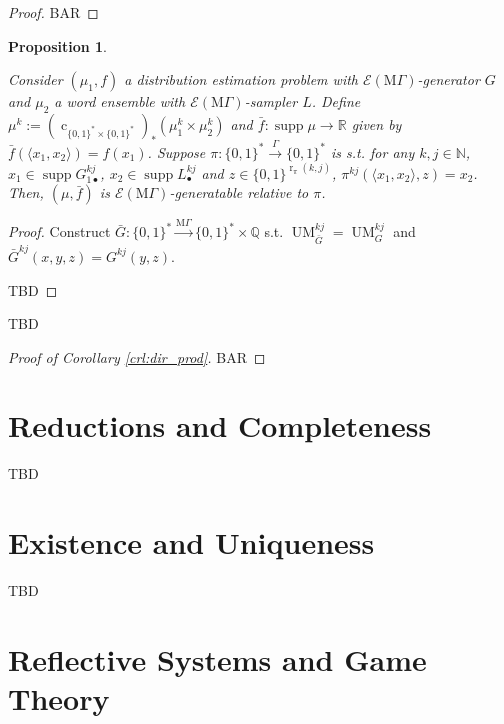 \documentclass{article}
\numberwithin{equation}{section}
\theoremstyle{definition}
\theoremstyle{plain}
\newtheorem{proposition}{Proposition}[section]
\newcommand{\Bool}{\{0,1\}}
\newcommand{\Words}{{\Bool^*}}
\DeclareMathOperator{\Supp}{supp}
\DeclareMathOperator{\R}{r}
\DeclareMathOperator{\UM}{UM}
\DeclareMathOperator{\En}{c}
\newcommand{\Nats}{\mathbb{N}}
\newcommand{\Rats}{\mathbb{Q}}
\newcommand{\Reals}{\mathbb{R}}
\newcommand{\Chev}[1]{\langle #1 \rangle}
\newcommand{\MGrow}{\mathrm{M}\Gamma}
\newcommand{\Fall}{\mathcal{E}}
\newcommand{\Scheme}{\xrightarrow{\Gamma}}
\newcommand{\MScheme}{\xrightarrow{\MGrow}}
\begin{document}
\begin{proof}

BAR

\end{proof}

\begin{samepage}
\begin{proposition}
\label{prp:tbd}

Consider $(\mu_1, f)$ a distribution estimation problem with $\Fall(\MGrow)$-generator $G$ and $\mu_2$ a word ensemble with $\Fall(\MGrow)$-sampler $L$. Define ${\mu^k:=(\En_{\Words \times \Words})_*(\mu_1^k \times \mu_2^k)}$ and $\bar{f}: \Supp \mu \rightarrow \Reals$ given by $\bar{f}(\Chev{x_1,x_2})=f(x_1)$. Suppose $\pi: \Words \Scheme \Words$ is s.t. for any $k,j \in \Nats$, $x_1 \in \Supp G_{1\bullet}^{kj}$, ${x_2 \in \Supp L_\bullet^{kj}}$ and $z \in \Bool^{\R_\pi(k,j)}$, $\pi^{kj}(\Chev{x_1,x_2},z)=x_2$. Then, $(\mu,\bar{f})$ is $\Fall(\MGrow)$-generatable relative to $\pi$.

\end{proposition}
\end{samepage}

\begin{proof}

Construct $\bar{G}: \Words \MScheme \Words \times \Rats$ s.t. $\UM_{\bar{G}}^{kj}=\UM_G^{kj}$ and ${\bar{G}^{kj}(x,y,z)=G^{kj}(y,z)}$. 

TBD

\end{proof}

TBD

\begin{proof}[Proof of Corollary \ref{crl:dir_prod}]

BAR

\end{proof}

\section{Reductions and Completeness}
\label{sec:reductions}

TBD

\section{Existence and Uniqueness}
\label{sec:e_and_u}

TBD

\section{Reflective Systems and Game Theory}
\label{sec:reflective}
\end{document}
